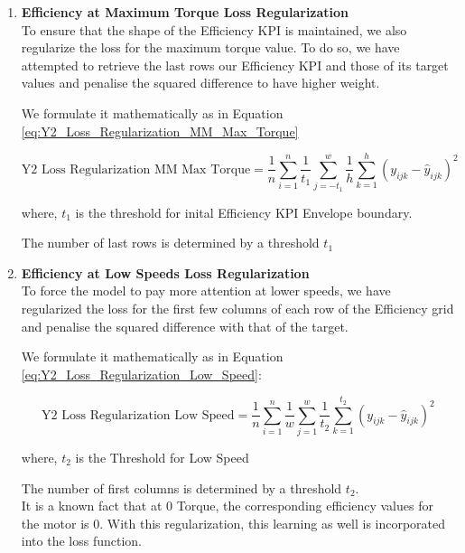 \documentclass{report} %
\begin{document}
\begin{enumerate}

\item \textbf{Efficiency at Maximum Torque Loss Regularization} \\

To ensure that the shape of the Efficiency \ac{KPI} is maintained, we also regularize the loss for the maximum torque value.
To do so, we have attempted to retrieve the last rows our Efficiency \ac{KPI} and those of its target values and penalise the squared difference to have higher weight.

We formulate it mathematically as in Equation \ref{eq:Y2_Loss_Regularization_MM_Max_Torque}

\begin{equation}
    \text{Y2 Loss Regularization MM Max Torque} = \frac{1}{n} \sum_{i=1}^{n} \frac{1}{t_{1}} \sum_{j=-t_{1}}^{w} \frac{1}{h} \sum_{k=1}^{h} (y_{ijk} - \hat{y}_{ijk})^2
    \label{eq:Y2_Loss_Regularization_MM_Max_Torque}
\end{equation}

where, \(t_{1}\) is the threshold for inital Efficiency \ac{KPI} Envelope boundary.

The number of last rows is determined by a threshold $t_{1}$

\item \textbf{Efficiency at Low Speeds Loss Regularization} \\

To force the model to pay more attention at lower speeds, we have regularized the loss for the first few columns of each row of the Efficiency grid and penalise the squared difference with that of the target.

We formulate it mathematically as in Equation \ref{eq:Y2_Loss_Regularization_Low_Speed}:

\begin{equation}
    \text{Y2 Loss Regularization Low Speed} = \frac{1}{n} \sum_{i=1}^{n} \frac{1}{w} \sum_{j=1}^{w} \frac{1}{t_{2}} \sum_{k=1}^{t_{2}} (y_{ijk} - \hat{y}_{ijk})^2
    \label{eq:Y2_Loss_Regularization_Low_Speed}
\end{equation}

where, \(t_{2}\) is the Threshold for Low Speed

The number of first columns is determined by a threshold $t_{2}$. \\
It is a known fact that at 0 Torque, the corresponding efficiency values for the motor is 0. With this regularization, this learning as well is incorporated into the loss function.\\


\end{enumerate}
\end{document}

